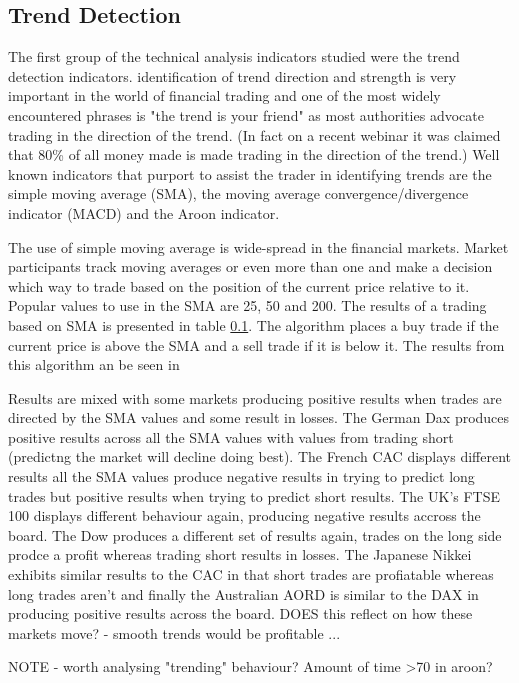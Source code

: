 \subsection{Trend Detection}
The first group of the technical analysis indicators studied were the trend detection indicators. identification of trend direction and strength is very important in the world of financial trading and one of the most widely encountered phrases is "the trend is your friend" as most authorities advocate trading in the direction of the trend. (In fact on a recent webinar it was claimed that 80\% of all money made is made trading in the direction of the trend.)  Well known indicators that purport to assist the trader in identifying trends are the simple moving average (SMA), the moving average convergence/divergence indicator (MACD) and the Aroon indicator.

The use of simple moving average is wide-spread in the financial markets. Market participants track moving averages or even more than one and make a decision which way to trade based on the position of the current price relative to it. Popular values to use in the SMA are 25, 50 and 200. The results of a trading based on SMA is presented in table \ref{}. The algorithm places a buy trade if the current price is above the SMA and a sell trade if it is below it. The results from this algorithm an be seen in 

Results are mixed with some markets producing positive results when trades are directed by the SMA values and some result in losses. The German Dax produces positive results across all the SMA values with values from trading short (predictng the market will decline doing best).  The French CAC displays different results all the SMA values produce negative results in trying to  predict long trades but positive results when trying to predict short results.  The UK's FTSE 100 displays different behaviour again, producing negative results accross the board. The Dow produces a different set of results again, trades on the long side prodce a profit whereas trading short results in losses.  The Japanese Nikkei exhibits similar results to the CAC in that short trades are profiatable whereas long trades aren't and finally the Australian AORD is similar to the DAX in producing positive results across the board. DOES this reflect on how these markets move? - smooth trends would be profitable ...

NOTE - worth analysing "trending" behaviour?  Amount of time >70 in aroon?   

